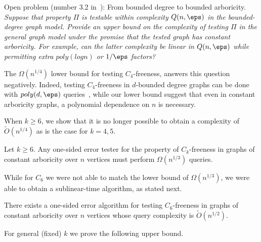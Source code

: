 \smallskip\noindent\textsf{Open problem (number 3.2 in~\cite{goldreich2021open}): From bounded degree to bounded arboricity.} \newline
\textit{Suppose that property $\Pi$ is
testable within complexity $Q(n,\eps)$ in the bounded-degree graph model. Provide an upper
bound on the complexity of testing $\Pi$ in the general graph model under the promise that the tested graph has constant arboricity. For example, can the latter complexity be linear in $Q(n,\eps)$ while
permitting extra $poly(log n)$ or $1/\eps$ factors?}
\smallskip

The $\Omega(n^{1/4})$ lower bound for testing $C_4$-freeness, answers this question negatively. Indeed, %
testing $C_4$-freeness in $d$-bounded degree graphs  can be done with $poly(d,\eps)$ queries~\cite{GR-bound}, while our lower bound suggest that even in constant  arboricity graphs, a polynomial dependence on $n$ is necessary.

\smallskip
When $k \geq 6$, we show that it is no longer possible to obtain a complexity of $\widetilde{O}(n^{1/4})$ as is the case for $k=4,5$.

\newcommand{\GenLB}{
Let $k\geq 6$.
Any one-sided error tester for the property of $C_k$-freeness in graphs of constant arboricity over  $n$ vertices 
must perform $\Omega(n^{1/3})$ queries.
}


\begin{theorem}\label{thm:lb_ck_const_alpha}
\GenLB
\end{theorem}


While for $C_6$ we were not able to match the lower bound of $\Omega(n^{1/3})$, we were able to obtain a sublinear-time algorithm, as stated next.


\begin{theorem}\label{thm:C6-ub-intro}
There exists a one-sided error algorithm for testing $C_6$-freeness in graphs of constant arboricity  over $n$ vertices whose query complexity %
is $\widetilde{O}(n^{1/2})$.
\end{theorem}


\smallskip
For general (fixed) $k$ we prove the following upper bound. 





